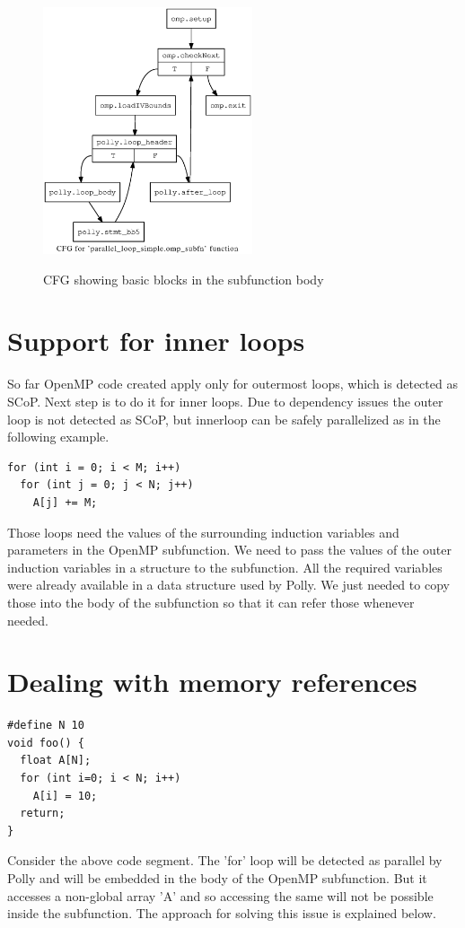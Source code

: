 \begin{figure}
\begin{center}
  \label{fig:subfunction_cfg}
  \includegraphics[width=0.55\textwidth]{images/cfg2.ps}
  \caption{CFG showing basic blocks in the subfunction body}
\end{center}
\end{figure}

\section{Support for inner loops}

So far OpenMP code created apply only for outermost loops, which is detected as SCoP. Next step is to do it for
inner loops. Due to dependency issues the outer loop is not detected as SCoP, but innerloop can be safely
parallelized as in the following example.
{\footnotesize
\begin{lstlisting}
for (int i = 0; i < M; i++)
  for (int j = 0; j < N; j++)
    A[j] += M;
\end{lstlisting}
}
Those loops need the values of the surrounding induction variables and parameters in the OpenMP subfunction. We need
to pass the values of the outer induction variables in a structure to the subfunction. All the required variables
were already available in a data structure used by Polly. We just needed to copy those into the body of the subfunction
so that it can refer those whenever needed.

\section{Dealing with memory references}
{\footnotesize
\begin{lstlisting}
#define N 10
void foo() {
  float A[N];
  for (int i=0; i < N; i++)
    A[i] = 10;
  return;
}
\end{lstlisting}
}
Consider the above code segment. The 'for' loop will be detected as parallel by Polly and will be embedded in the
body of the OpenMP subfunction. But it accesses a non-global array 'A' and so accessing the same will not be possible inside
the subfunction. The approach for solving this issue is explained below.

